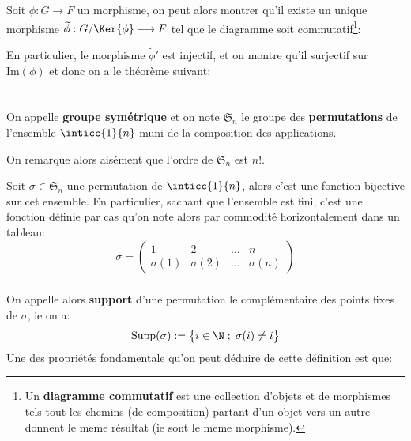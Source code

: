\subsection*{}
Soit \(\phi : G \longrightarrow F\) un morphisme, on peut alors montrer qu'il existe un unique morphisme \(\widetilde{\phi} : G/\Ker{\phi} \longrightarrow F\) tel que le diagramme soit commutatif\footnote[1]{Un \textbf{diagramme commutatif} est une collection d'objets et de morphismes tels tout les chemins (de composition) partant d'un objet vers un autre donnent le meme résultat (ie sont le meme morphisme).}:
\begin{center}
\end{center}
En particulier, le morphisme \(\widetilde{\phi}'\) est injectif, et on montre qu'il surjectif sur \(\text{Im}(\phi)\) et donc on a le théorème suivant:

\chapter*{}
On appelle \textbf{groupe symétrique} et on note \(\mathfrak{S}_n\) le groupe des \textbf{permutations} de l'ensemble \(\inticc{1}{n}\) muni de la composition des applications.\<

On remarque alors aisément que l'ordre de \(\mathfrak{S}_n\) est \(n!\).\<

Soit \(\sigma \in \mathfrak{S}_n\) une permutation de \(\inticc{1}{n}\), alors c'est une fonction bijective sur cet ensemble. En particulier, sachant que l'ensemble est fini, c'est une fonction définie par cas qu'on note alors par commodité horizontalement dans un tableau:
\[
   \sigma =  \begin{pmatrix}
      1 & 2 & \ldots & n\\
      \sigma(1) & \sigma(2) & \ldots & \sigma(n)
   \end{pmatrix}
\]
\subsection*{}
On appelle alors \textbf{support} d'une permutation le complémentaire des points fixes de \(\sigma\), ie on a:
\[
   \text{Supp}(\sigma) := \bigl\{ i \in \N \; ; \; \sigma(i) \neq i \bigl\}   
\]
Une des propriétés fondamentale qu'on peut déduire de cette définition est que:
